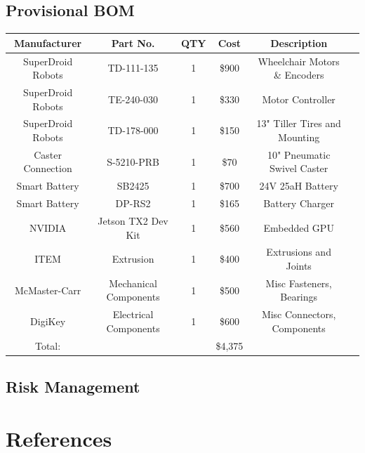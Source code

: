 \documentclass{article}
\begin{document}
\subsection{Provisional BOM}
\begin{center}
\begin{tabular}{ |c|c|c|c|c|c| }
  \hline
    Manufacturer & Part No. & QTY & Cost & Description\\
    \hline 
    SuperDroid Robots & TD-111-135 & 1 & \$900 & Wheelchair Motors \& Encoders \\
	SuperDroid Robots & TE-240-030 & 1 & \$330 & Motor Controller \\
	SuperDroid Robots & TD-178-000 & 1 & \$150 & 13" Tiller Tires and Mounting \\
	Caster Connection & S-5210-PRB & 1 & \$70 & 10" Pneumatic Swivel Caster \\
	Smart Battery & SB2425 & 1 & \$700 & 24V 25aH Battery \\
    Smart Battery & DP-RS2 & 1 & \$165 & Battery Charger \\
    NVIDIA & Jetson TX2 Dev Kit & 1 & \$560 &  Embedded GPU \\
	ITEM & Extrusion & 1 & \$400 & Extrusions and Joints \\
	McMaster-Carr & Mechanical Components & 1 & \$500 & Misc Fasteners, Bearings \\
	DigiKey & Electrical Components & 1 & \$600 & Misc Connectors, Components \\
	\hline 
	Total: &&& \$4,375 &\\
	
    
  \hline
\end{tabular}
\end{center}

\subsection{Risk Management}
\section{References}
\end{document}
